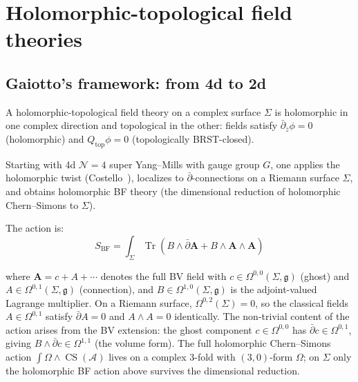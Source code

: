 \section{Holomorphic-topological field theories}

\subsection{Gaiotto's framework: from 4d to 2d}

\begin{definition}
A holomorphic-topological field theory on a complex surface $\Sigma$ is holomorphic in one complex direction and topological in the other: fields satisfy $\bar{\partial}_{\bar{z}} \phi = 0$ (holomorphic) and $Q_{\text{top}} \phi = 0$ (topologically BRST-closed).
\end{definition}

\begin{theorem}[HT theory from 4d \texorpdfstring{$\mathcal{N}=4$}{N=4} SYM]
Starting with 4d $\mathcal{N}=4$ super Yang--Mills with gauge group $G$, one applies the holomorphic twist (Costello~\cite{costello-gaiotto}), localizes to $\bar{\partial}$-connections on a Riemann surface $\Sigma$, and obtains holomorphic BF theory (the dimensional reduction of holomorphic Chern--Simons to $\Sigma$).

The action is:
\[S_{\text{BF}} = \int_{\Sigma} \operatorname{Tr}\!\left(B \wedge \bar{\partial} \mathbf{A} + B \wedge \mathbf{A} \wedge \mathbf{A}\right)\]

where $\mathbf{A} = c + A + \cdots$ denotes the full BV field with $c \in \Omega^{0,0}(\Sigma, \mathfrak{g})$ (ghost) and $A \in \Omega^{0,1}(\Sigma, \mathfrak{g})$ (connection), and $B \in \Omega^{1,0}(\Sigma, \mathfrak{g})$ is the adjoint-valued Lagrange multiplier.
On a Riemann surface, $\Omega^{0,2}(\Sigma) = 0$, so the classical fields
$A \in \Omega^{0,1}$ satisfy $\bar{\partial}A = 0$ and $A \wedge A = 0$ identically. The non-trivial
content of the action arises from the BV extension: the ghost component $c \in \Omega^{0,0}$ has
$\bar{\partial}c \in \Omega^{0,1}$, giving $B \wedge \bar{\partial}c \in \Omega^{1,1}$ (the volume form).
The full holomorphic Chern--Simons action $\int \Omega \wedge \operatorname{CS}(\mathcal{A})$ lives on a
complex $3$-fold with $(3,0)$-form $\Omega$; on $\Sigma$ only the holomorphic BF action above survives the dimensional reduction.
\end{theorem}

